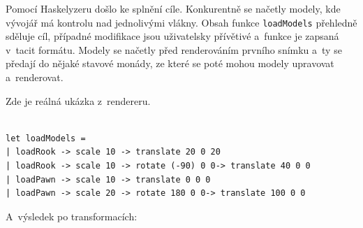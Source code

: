 \documentclass[male, czech]{kithesis}
\newenvironment{code}{\captionsetup{type=listing}}{}
\newcommand{\haskellInline}[1]{\colorbox{gray!10}{\texttt{#1}}}
\begin{document}
Pomocí Haskelyzeru došlo ke splnění cíle.
Konkurentně se načetly modely, 
kde vývojář má kontrolu nad jednolivými vlákny.
Obsah funkce \haskellInline{loadModels} přehledně sděluje cíl,  
případné modifikace jsou uživatelsky přívětivé
a~funkce je zapsaná v~tacit formátu.
Modely se načetly před renderováním prvního snímku
a~ty se předají do nějaké stavové monády, 
ze které se poté mohou modely upravovat a~renderovat.

Zde je reálná ukázka z~rendereru.

\begin{code}
\begin{verbatim}

let loadModels = 
| loadRook -> scale 10 -> translate 20 0 20
| loadRook -> scale 10 -> rotate (-90) 0 0-> translate 40 0 0
| loadPawn -> scale 10 -> translate 0 0 0
| loadPawn -> scale 20 -> rotate 180 0 0-> translate 100 0 0

\end{verbatim}
\end{code}

\newpage

A~výsledek po transformacích:

{\begin{center}
\end{center}
}
\end{document}
